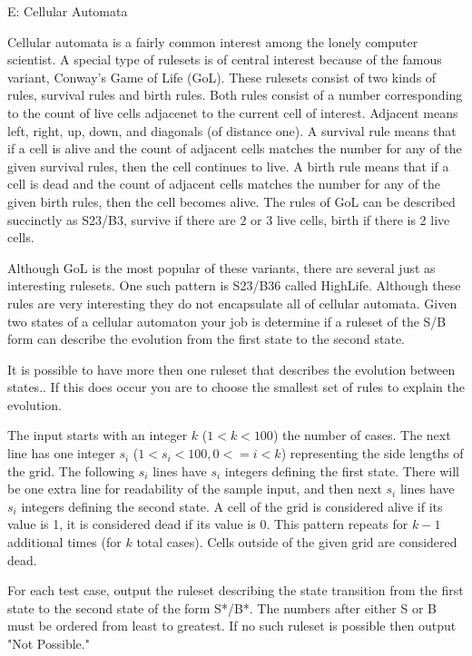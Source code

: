 \begin{problem}{E: Cellular Automata}

Cellular automata is a fairly common interest among the lonely computer scientist.
A special type of rulesets is of central interest because of the famous variant, Conway's Game of Life (GoL).
These rulesets consist of two kinds of rules, survival rules and birth rules.
Both rules consist of a number corresponding to the count of live cells adjacenet to the current cell of interest.
Adjacent means left, right, up, down, and diagonals (of distance one).
A survival rule means that if a cell is alive and the count of adjacent cells matches the number for any of the given survival rules, then the cell continues to live.
A birth rule means that if a cell is dead and the count of adjacent cells matches the number for any of the given birth rules, then the cell becomes alive.
The rules of GoL can be described succinctly as S23/B3, survive if there are 2 or 3 live cells, birth if there is 2 live cells.

Although GoL is the most popular of these variants, there are several just as interesting rulesets.
One such pattern is S23/B36 called HighLife.
Although these rules are very interesting they do not encapsulate all of cellular automata.
Given two states of a cellular automaton your job is determine if a ruleset of the S/B form can describe the evolution from the first state to the second state.

It is possible to have more then one ruleset that describes the evolution between states..
If this does occur you are to choose the smallest set of rules to explain the evolution.
\end{problem}

\begin{formalin}
The input starts with an integer $k$ ($1 < k < 100$) the number of cases.
The next line has one integer $s_i$ ($1 < s_i < 100, 0 <= i < k$) representing the side lengths of the grid.
The following $s_i$ lines have $s_i$ integers defining the first state.
There will be one extra line for readability of the sample input, and then next $s_i$ lines have $s_i$ integers defining the second state.
A cell of the grid is considered alive if its value is 1, it is considered dead if its value is 0.
This pattern repeats for $k-1$ additional times (for $k$ total cases).
Cells outside of the given grid are considered dead.
\end{formalin}

\begin{formalout}
For each test case, output the ruleset describing the state transition from the first state to the second state of the form S*/B*. The numbers after either S or B must be ordered from least to greatest. If no such ruleset is possible then output "Not Possible."
\end{formalout}

